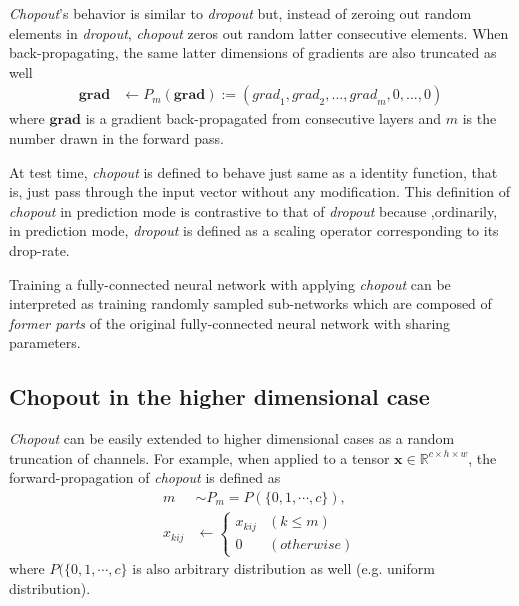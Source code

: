 \documentclass{article}
\begin{document}
    \textit{Chopout}'s behavior is similar to \textit{dropout} but, instead of zeroing out random elements in \textit{dropout}, \textit{chopout} zeros out random latter consecutive elements. When back-propagating, the same latter dimensions of gradients are also truncated as well
    \begin{align}
        \mathbf{grad} &\leftarrow P_m(\mathbf{grad}) := ({grad}_1, {grad}_2, ..., {grad}_m, 0, ..., 0)
    \end{align}    
    where $\mathbf{grad}$ is a gradient back-propagated from consecutive layers and $m$ is the number drawn in the forward pass.
    
    At test time, \textit{chopout} is defined to behave just same as a identity function, that is, just pass through the input vector without any modification. This definition of \textit{chopout} in prediction mode is contrastive to that of \textit{dropout} because ,ordinarily, in prediction mode, \textit{dropout} is defined as a scaling operator corresponding to its drop-rate.
    
    Training a fully-connected neural network with applying \textit{chopout} can be interpreted as training randomly sampled sub-networks which are composed of \textit{former parts} of the original fully-connected neural network with sharing parameters.

    \subsection{Chopout in the higher dimensional case}
    \label{subsec:chopout-nd}
    
    \textit{Chopout} can be easily extended to higher dimensional cases as a random truncation of channels. 
    For example, when applied to a tensor $\mathbf{x} \in 
    \mathbb{R}^{c \times h \times w}$, the forward-propagation of \textit{chopout} is defined as
    \begin{align}
        m &\sim P_m = P(\{0, 1, \cdots, c\}), \nonumber \\
        x_{kij} &\leftarrow \begin{cases}
            x_{kij} & (k \leq m) \\
            0 & (otherwise)
            \end{cases} \nonumber
    \end{align}
    where $P(\{0, 1, \cdots, c\}$ is also arbitrary distribution as well (e.g. uniform distribution). 
    
\end{document}
